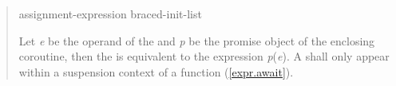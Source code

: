 \begin{quote}
\begin{bnf}
  \br
   assignment-expression\br
   braced-init-list
\end{bnf}

\pnum
  Let \textit{e} be the operand of the  and \textit{p} be the promise object of the enclosing coroutine, then the  is equivalent to the expression  \textit{p}(\textit{e}). A  shall only appear within a suspension context of a function (\ref{expr.await}).

%  
%
%
%


\end{quote}


